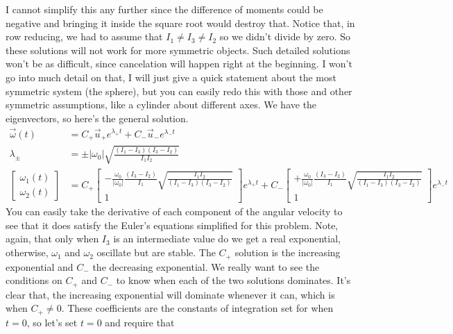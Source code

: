 \documentclass[10pt]{article}
\begin{document}
I cannot simplify this any further since the difference of moments 
could be negative and bringing it inside the square root would destroy that.
Notice that, in row reducing, we had to assume that $I_1\neq I_3\neq I_2$ 
so we didn't divide by zero. So
these solutions will not work for more symmetric objects. Such detailed 
solutions won't be as difficult, since cancelation will happen right at 
the beginning. I won't go into much detail on that, I will just give a quick 
statement about the most symmetric system (the sphere), but 
you can easily redo this with those and other symmetric assumptions, 
like a cylinder about different axes. We have the eigenvectors, so 
here's the general solution.
\begin{align}
    \vec{\omega}(t) &= C_+\vec{u}_+ e^{\lambda_+ t} + C_-\vec{u}_- 
        e^{\lambda_- t} \\
    \lambda_\pm &= \pm|\omega_0|\sqrt{\frac{(I_1-I_3)(I_3-I_2)}{I_1I_2}} \\
    \begin{bmatrix}
        \omega_1(t) \\
        \omega_2(t)
    \end{bmatrix}
    &= C_+
    \begin{bmatrix}
        -\frac{\omega_0}{|\omega_0|}\frac{(I_3-I_2)}{I_1}
            \sqrt{\frac{I_1I_2}{(I_1-I_3)(I_3-I_2)}} \\
        1
    \end{bmatrix}
    e^{\lambda_+ t} + C_-
    \begin{bmatrix}
        +\frac{\omega_0}{|\omega_0|}\frac{(I_3-I_2)}{I_1}
            \sqrt{\frac{I_1I_2}{(I_1-I_3)(I_3-I_2)}} \\
        1
    \end{bmatrix}
    e^{\lambda_- t}
\end{align}
You can easily take the derivative of each component of the angular velocity 
to see that it does satisfy the Euler's equations simplified for this problem.
Note, again, that only when $I_3$ is an intermediate value do we get a 
real exponential, otherwise, $\omega_1$ and $\omega_2$ oscillate but 
are stable. The $C_+$ solution is the increasing exponential and $C_-$ the 
decreasing exponential. We really want to see the conditions on 
$C_+$ and $C_-$ to know when each of the two solutions dominates. It's clear 
that, the increasing exponential will dominate whenever it can, which 
is when $C_+\neq0$. These coefficients are the constants of integration 
set for when $t=0$, so let's set $t=0$ and require that 
\end{document}
